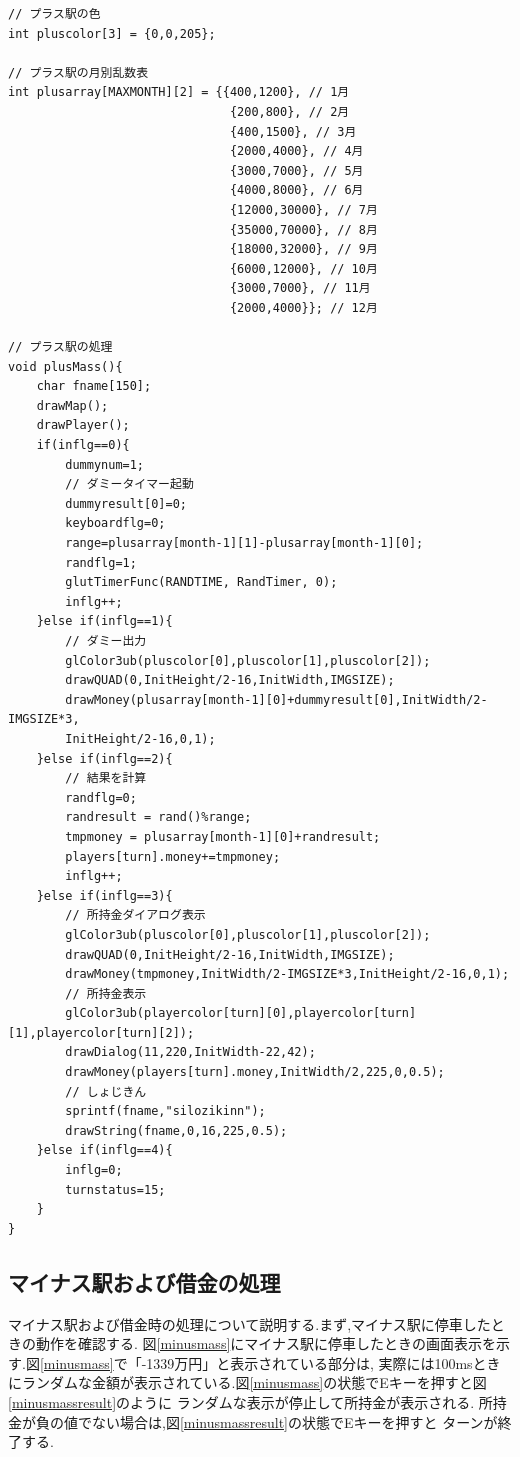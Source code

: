 \documentclass[a4j]{jarticle}
\begin{document}
    \begin{lstlisting}[basicstyle=\ttfamily\footnotesize, frame=single,label=plusMass,caption=plusMass関数]
// プラス駅の色
int pluscolor[3] = {0,0,205};

// プラス駅の月別乱数表
int plusarray[MAXMONTH][2] = {{400,1200}, // 1月
                               {200,800}, // 2月
                               {400,1500}, // 3月
                               {2000,4000}, // 4月
                               {3000,7000}, // 5月
                               {4000,8000}, // 6月
                               {12000,30000}, // 7月
                               {35000,70000}, // 8月
                               {18000,32000}, // 9月
                               {6000,12000}, // 10月
                               {3000,7000}, // 11月
                               {2000,4000}}; // 12月

// プラス駅の処理
void plusMass(){
    char fname[150];
    drawMap();
    drawPlayer(); 
    if(inflg==0){
        dummynum=1;
        // ダミータイマー起動
        dummyresult[0]=0;
        keyboardflg=0;
        range=plusarray[month-1][1]-plusarray[month-1][0];
        randflg=1;
        glutTimerFunc(RANDTIME, RandTimer, 0);
        inflg++;            
    }else if(inflg==1){
        // ダミー出力
        glColor3ub(pluscolor[0],pluscolor[1],pluscolor[2]);
        drawQUAD(0,InitHeight/2-16,InitWidth,IMGSIZE);
        drawMoney(plusarray[month-1][0]+dummyresult[0],InitWidth/2-IMGSIZE*3,
        InitHeight/2-16,0,1);            
    }else if(inflg==2){
        // 結果を計算
        randflg=0;
        randresult = rand()%range;
        tmpmoney = plusarray[month-1][0]+randresult;
        players[turn].money+=tmpmoney;
        inflg++;
    }else if(inflg==3){
        // 所持金ダイアログ表示
        glColor3ub(pluscolor[0],pluscolor[1],pluscolor[2]);
        drawQUAD(0,InitHeight/2-16,InitWidth,IMGSIZE);
        drawMoney(tmpmoney,InitWidth/2-IMGSIZE*3,InitHeight/2-16,0,1);
        // 所持金表示
        glColor3ub(playercolor[turn][0],playercolor[turn][1],playercolor[turn][2]);
        drawDialog(11,220,InitWidth-22,42);
        drawMoney(players[turn].money,InitWidth/2,225,0,0.5);
        // しょじきん
        sprintf(fname,"silozikinn");
        drawString(fname,0,16,225,0.5);               
    }else if(inflg==4){
        inflg=0;
        turnstatus=15;
    }
}
    \end{lstlisting}
    \subsection{マイナス駅および借金の処理}
    マイナス駅および借金時の処理について説明する.まず,マイナス駅に停車したときの動作を確認する.
    図\ref{minusmass}にマイナス駅に停車したときの画面表示を示す.図\ref{minusmass}で「-1339万円」と表示されている部分は,
    実際には100msときにランダムな金額が表示されている.図\ref{minusmass}の状態でEキーを押すと図\ref{minusmassresult}のように
    ランダムな表示が停止して所持金が表示される. 所持金が負の値でない場合は,図\ref{minusmassresult}の状態でEキーを押すと
    ターンが終了する.
\end{document}
